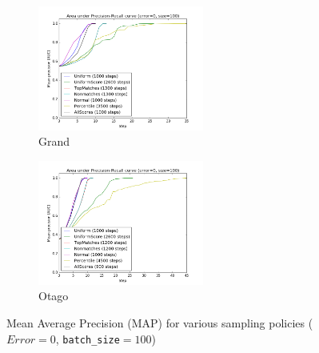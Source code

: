 \begin{figure}[htbp]
  \centering
  \begin{subfigure}[t]{\textwidth}
      \centering
      \includegraphics[width=0.6\textwidth]{policies/grand}
      \caption{Grand}
  \end{subfigure}%

  \begin{subfigure}[t]{\textwidth}
      \centering
      \includegraphics[width=0.6\textwidth]{policies/otago}
      \caption{Otago}
  \end{subfigure}%
  \captionsetup{justification=centering}
  \caption{Mean Average Precision (MAP) for various sampling policies
  ($Error=0$, \texttt{batch\_size}$=100$)}
\end{figure}

